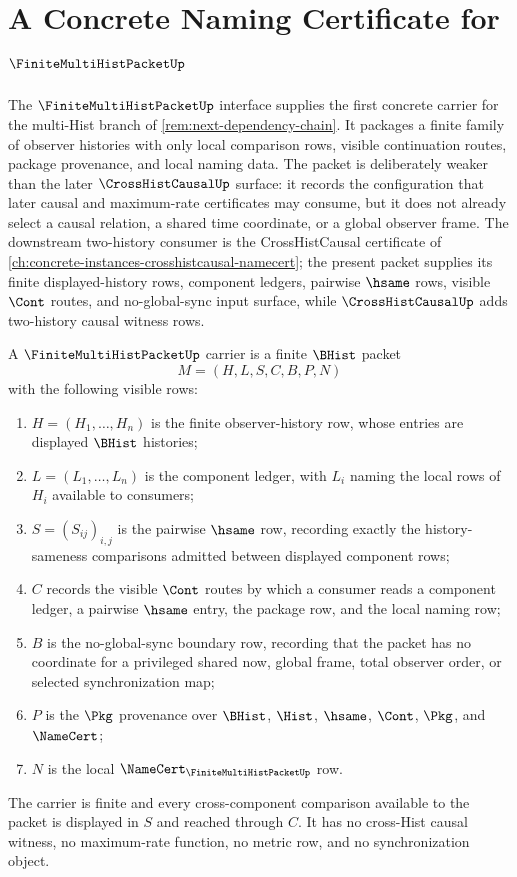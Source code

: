 \chapter{A Concrete Naming Certificate for $\FiniteMultiHistPacketUp$}
\label{ch:concrete-instances-finite-multihist-packet-namecert}

The $\FiniteMultiHistPacketUp$ interface supplies the first concrete carrier for the multi-Hist branch of \autoref{rem:next-dependency-chain}. It packages a finite family of observer histories with only local comparison rows, visible continuation routes, package provenance, and local naming data. The packet is deliberately weaker than the later $\CrossHistCausalUp$ surface: it records the configuration that later causal and maximum-rate certificates may consume, but it does not already select a causal relation, a shared time coordinate, or a global observer frame. The downstream two-history consumer is the CrossHistCausal certificate of \autoref{ch:concrete-instances-crosshistcausal-namecert}; the present packet supplies its finite displayed-history rows, component ledgers, pairwise $\hsame$ rows, visible $\Cont$ routes, and no-global-sync input surface, while $\CrossHistCausalUp$ adds two-history causal witness rows.

\begin{definition}
\label{def:finite-multihist-packet-carrier}
A $\FiniteMultiHistPacketUp$ carrier is a finite $\BHist$ packet
$$
M=(H,L,S,C,B,P,N)
$$
with the following visible rows:
\begin{enumerate}
\item $H=(H_1,\ldots,H_n)$ is the finite observer-history row, whose entries are displayed $\BHist$ histories;
\item $L=(L_1,\ldots,L_n)$ is the component ledger, with $L_i$ naming the local rows of $H_i$ available to consumers;
\item $S=(S_{ij})_{i,j}$ is the pairwise $\hsame$ row, recording exactly the history-sameness comparisons admitted between displayed component rows;
\item $C$ records the visible $\Cont$ routes by which a consumer reads a component ledger, a pairwise $\hsame$ entry, the package row, and the local naming row;
\item $B$ is the no-global-sync boundary row, recording that the packet has no coordinate for a privileged shared now, global frame, total observer order, or selected synchronization map;
\item $P$ is the $\Pkg$ provenance over $\BHist$, $\Hist$, $\hsame$, $\Cont$, $\Pkg$, and $\NameCert$;
\item $N$ is the local $\NameCert_{\FiniteMultiHistPacketUp}$ row.
\end{enumerate}
The carrier is finite and every cross-component comparison available to the packet is displayed in $S$ and reached through $C$. It has no cross-Hist causal witness, no maximum-rate function, no metric row, and no synchronization object.
\end{definition}

